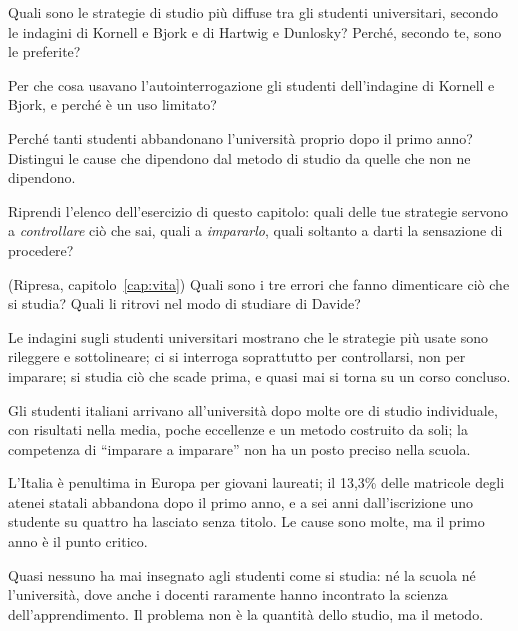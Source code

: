 \begin{domande}
  \item Quali sono le strategie di studio più diffuse tra gli studenti
        universitari, secondo le indagini di Kornell e Bjork e di
        Hartwig e Dunlosky? Perché, secondo te, sono le preferite?
  \item Per che cosa usavano l'autointerrogazione gli studenti
        dell'indagine di Kornell e Bjork, e perché è un uso limitato?
  \item Perché tanti studenti abbandonano l'università proprio dopo il
        primo anno? Distingui le cause che dipendono dal metodo di studio
        da quelle che non ne dipendono.
  \item Riprendi l'elenco dell'esercizio di questo capitolo: quali delle
        tue strategie servono a \emph{controllare} ciò che sai, quali a
        \emph{impararlo}, quali soltanto a darti la sensazione di
        procedere?
  \item (Ripresa, capitolo~\ref{cap:vita}) Quali sono i tre errori che
        fanno dimenticare ciò che si studia? Quali li ritrovi nel modo di
        studiare di Davide?
\end{domande}

\begin{sintesi}
  \item Le indagini sugli studenti universitari mostrano che le
        strategie più usate sono rileggere e sottolineare; ci si
        interroga soprattutto per controllarsi, non per imparare; si
        studia ciò che scade prima, e quasi mai si torna su un corso
        concluso.
  \item Gli studenti italiani arrivano all'università dopo molte ore di
        studio individuale, con risultati nella media, poche eccellenze e
        un metodo costruito da soli; la competenza di \enquote{imparare a
        imparare} non ha un posto preciso nella scuola.
  \item L'Italia è penultima in Europa per giovani laureati; il 13,3\%
        delle matricole degli atenei statali abbandona dopo il primo
        anno, e a sei anni dall'iscrizione uno studente su quattro ha
        lasciato senza titolo. Le cause sono molte, ma il primo anno è il
        punto critico.
  \item Quasi nessuno ha mai insegnato agli studenti come si studia: né
        la scuola né l'università, dove anche i docenti raramente hanno
        incontrato la scienza dell'apprendimento. Il problema non è la
        quantità dello studio, ma il metodo.
\end{sintesi}

\finecapitolo
